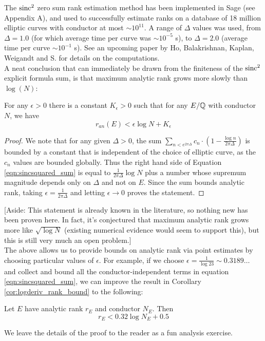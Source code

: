 The $\text{sinc}^2$ zero sum rank estimation method has been implemented in Sage (see Appendix A), and used to successfully estimate ranks on a database of 18 million elliptic curves with conductor at most $\sim 10^{11}$. A range of $\Delta$ values was used, from $\Delta=1.0$ (for which average time per curve was $\sim 10^{-5}$ s), to $\Delta=2.0$ (average time per curve $\sim 10^{-1}$ s). See an upcoming paper by Ho, Balakrishnan, Kaplan, Weigandt and S. for details on the computations. \\

A neat conclusion that can immediately be drawn from the finiteness of the $\text{sinc}^2$ explicit formula sum, is that maximum analytic rank grows more slowly than $\log(N)$:

\begin{corollary}\label{cor:rank_slower_than_log_N}
For any $\epsilon >0$ there is a constant $K_{\epsilon}>0$ such that for any $E/\mathbb{Q}$ with conductor $N$, we have
\begin{equation}
r_{an}(E) < \epsilon \log N + K_{\epsilon}
\end{equation}
\end{corollary}
\begin{proof}
We note that for any given $\Delta>0$, the sum $ \sum_{n<e^{2\pi \Delta}} c_n \cdot \left(1-\frac{\log n}{2\pi \Delta}\right)$ is bounded by a constant that is independent of the choice of elliptic curve, as the $c_n$ values are bounded globally. Thus the right hand side of Equation \ref{eqn:sincsquared_sum} is equal to $\frac{1}{2\pi \Delta}\log N$ plus a number whose supremum magnitude depends only on $\Delta$ and not on $E$. Since the sum bounds analytic rank, taking $\epsilon = \frac{1}{2\pi \Delta}$ and letting $\epsilon \to 0$ proves the statement.
\end{proof}

[Aside: This statement is already known in the literature, so nothing new has been proven here. In fact, it's conjectured that maximum analytic rank grows more like $\sqrt{\log N}$ (existing numerical evidence would seem to support this), but this is still very much an open problem.] \\

The above allows us to provide bounds on analytic rank via point estimates by choosing particular values of $\epsilon$. For example, if we choose $\epsilon = \frac{1}{\log 23} \sim 0.3189\ldots$ and collect and bound all the conductor-independent terms in equation \ref{eqn:sincsquared_sum}, we can improve the result in Corollary \ref{cor:logderiv_rank_bound} to the following:
\begin{corollary}\label{cor:better_an_bound}
Let $E$ have analytic rank $r_E$ and conductor $N_E$. Then
\begin{equation}
r_E < 0.32 \log N_E + 0.5
\end{equation}
\end{corollary}
We leave the details of the proof to the reader as a fun analysis exercise.\\

